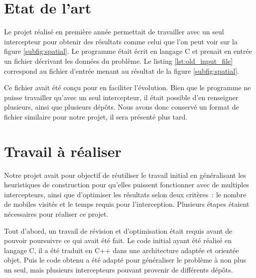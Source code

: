     \section{Etat de l'art}

    	Le projet réalisé en première année permettait de travailler avec un seul intercepteur pour obtenir des résultats comme celui que l'on peut voir sur la figure \ref{subfig:spatial}. Le programme était écrit en langage C et prenait en entrée un fichier décrivant les données du problème. Le listing \ref{lst:old_input_file} correspond au fichier d'entrée menant au résultat de la figure \ref{subfig:spatial}.

    	Ce fichier avait été conçu pour en faciliter l'évolution. Bien que le programme ne puisse travailler qu'avec un seul intercepteur, il était possible d'en renseigner plusieurs, ainsi que plusieurs dépôts. Nous avons donc conservé un format de fichier similaire pour notre projet, il sera présenté plus tard.

    	\begin{code}
    		\label{lst:old_input_file}
    	\end{code}

    \section{Travail à réaliser}
    	Notre projet avait pour objectif de réutiliser le travail initial en généralisant les heuristiques de construction pour qu'elles puissent fonctionner avec de multiples intercepteurs, ainsi que d'optimiser les résultats selon deux critères : le nombre de mobiles visités et le temps requis pour l'interception.
Plusieurs étapes étaient nécessaires pour réaliser ce projet.

Tout d'abord, un travail de révision et d'optimisation était requis avant de pouvoir poursuivre ce qui avait été fait. Le code initial ayant été réalisé en langage C, il a été traduit en C++ dans une architecture adaptée et orientée objet. Puis le code obtenu a été adapté pour généraliser le problème à non plus un seul, mais plusieurs intercepteurs pouvant provenir de différents dépôts.


